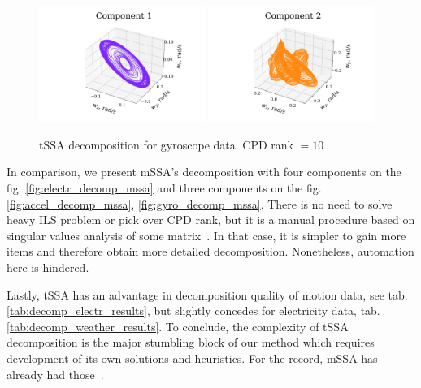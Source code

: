 \documentclass[referee, pdflatex]{sn-jnl}
\theoremstyle{definition}
\theoremstyle{plain}
\begin{document}
	\begin{figure}[h]
		\centering
		\includegraphics[width=0.48\textwidth, 	keepaspectratio]{../../experiments/motion/tssa/figs/decomposition/cpd_rank_10/gyro_1.png}
		\includegraphics[width=0.48\textwidth, keepaspectratio]{../../experiments/motion/tssa/figs/decomposition/cpd_rank_10/gyro_2.png}
		\caption{tSSA decomposition for gyroscope data. CPD rank $ = 10 $}\label{fig:gyro_decomp_tssa}
	\end{figure}
	
	In comparison, we present mSSA's decomposition with four components on the fig. \ref{fig:electr_decomp_mssa} and three components on the fig. \ref{fig:accel_decomp_mssa}, \ref{fig:gyro_decomp_mssa}. There is no need to solve heavy ILS problem or pick over CPD rank, but it is a manual procedure based on singular values analysis of some matrix~\cite{ecfb9dc578be43ae9ee8fc88b8ff9151}. In that case, it is simpler to gain more items and therefore obtain more detailed decomposition. Nonetheless, automation here is hindered.
	
	Lastly, tSSA has an advantage in decomposition quality of motion data, see tab. \ref{tab:decomp_electr_results}, but slightly concedes for electricity data, tab. \ref{tab:decomp_weather_results}. To conclude, the complexity of tSSA decomposition is the major stumbling block of our method which requires development of its own solutions and heuristics. For the record, mSSA has already had those~\cite{ecfb9dc578be43ae9ee8fc88b8ff9151}.
	
\end{document}
